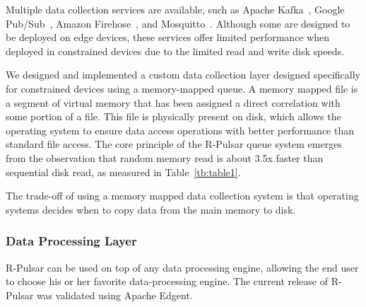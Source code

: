 Multiple data collection services are available, such as Apache Kafka~\cite{kafka}, Google Pub/Sub~\cite{google}, Amazon Firehose~\cite{amazon}, and Mosquitto~\cite{mosquitto}. Although some are designed to be deployed on edge devices, these services offer limited performance when deployed in constrained devices due to the limited read and write disk speeds.

We designed and implemented a custom data collection layer designed specifically for constrained devices using a memory-mapped queue. A memory mapped file is a segment of virtual memory that has been assigned a direct correlation with some portion of a file. This file is physically present on disk, which allows the operating system to ensure data access operations with better performance than standard file access. The core principle of the R-Pulsar queue system emerges from the observation that random memory read is about 3.5x faster than sequential disk read, as measured in Table~\ref{tb:table1}. 

The trade-off of using a memory mapped data collection system is that operating systems decides when to copy data from the main memory to disk.  
\\
\begin{table}[h!]
\centering
\caption{Measurements of Disk I/O vs RAM memory performance on a Raspberry Pi.} \label{tb:table1}
\end{table}

\subsubsection{Data Processing Layer}

R-Pulsar can be used on top of any data processing engine, allowing the end user to choose his or her favorite data-processing engine. The current release of R-Pulsar was validated using Apache Edgent. 

